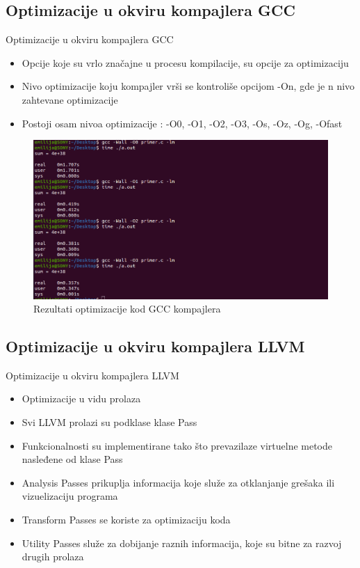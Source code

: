 \documentclass[compress, containsverbatim,mathserif, xcolor=dvipsnames, unicode]{beamer}
\begin{document}
\subsection{Optimizacije u okviru kompajlera GCC}
\begin{frame}{Optimizacije u okviru kompajlera GCC}
    \begin{itemize}
        \item Opcije koje su vrlo značajne u procesu kompilacije, su opcije za optimizaciju
        \item Nivo optimizacije koju kompajler vrši se kontroliše
opcijom -On, gde je n nivo zahtevane optimizacije
        \item Postoji osam nivoa optimizacije : -O0, -O1, -O2, -O3, -Os, -Oz, -Og, -Ofast
    \end{itemize}
     \begin{figure}[h!]
        \begin{center}
       \includegraphics[scale = 0.3]{../pics/test.png}
       \end{center}
       \caption{Rezultati optimizacije kod GCC kompajlera}
    \end{figure}    
\end{frame}

\subsection{Optimizacije u okviru kompajlera LLVM}
\begin{frame}{Optimizacije u okviru kompajlera LLVM}
    \begin{itemize}
        \item Optimizacije u vidu prolaza
        \item Svi LLVM prolazi su podklase klase Pass
        \item Funkcionalnosti su implementirane tako što prevazilaze virtuelne metode nasleđene od klase Pass
        \item Analysis Passes prikuplja informacija koje 
služe za otklanjanje grešaka ili vizuelizaciju programa
        \item Transform Passes se koriste za optimizaciju koda
        \item Utility Passes služe za dobijanje raznih
informacija, koje su bitne za razvoj drugih prolaza
    \end{itemize}    
\end{frame}
\end{document}
